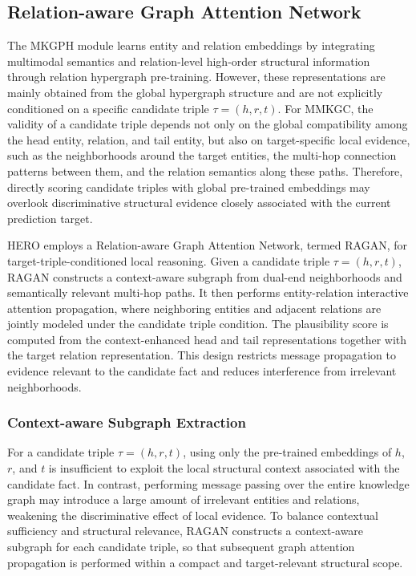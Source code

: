 \documentclass[pdflatex,sn-mathphys-num]{sn-jnl}
\begin{document}
\subsection{Relation-aware Graph Attention Network}

The MKGPH module learns entity and relation embeddings by integrating multimodal semantics and relation-level high-order structural information through relation hypergraph pre-training. However, these representations are mainly obtained from the global hypergraph structure and are not explicitly conditioned on a specific candidate triple $\tau=(h,r,t)$. For MMKGC, the validity of a candidate triple depends not only on the global compatibility among the head entity, relation, and tail entity, but also on target-specific local evidence, such as the neighborhoods around the target entities, the multi-hop connection patterns between them, and the relation semantics along these paths. Therefore, directly scoring candidate triples with global pre-trained embeddings may overlook discriminative structural evidence closely associated with the current prediction target.

HERO employs a Relation-aware Graph Attention Network, termed RAGAN, for target-triple-conditioned local reasoning. Given a candidate triple $\tau=(h,r,t)$, RAGAN constructs a context-aware subgraph from dual-end neighborhoods and semantically relevant multi-hop paths. It then performs entity-relation interactive attention propagation, where neighboring entities and adjacent relations are jointly modeled under the candidate triple condition. The plausibility score is computed from the context-enhanced head and tail representations together with the target relation representation. This design restricts message propagation to evidence relevant to the candidate fact and reduces interference from irrelevant neighborhoods.

\subsubsection{Context-aware Subgraph Extraction}

For a candidate triple $\tau=(h,r,t)$, using only the pre-trained embeddings of $h$, $r$, and $t$ is insufficient to exploit the local structural context associated with the candidate fact. In contrast, performing message passing over the entire knowledge graph may introduce a large amount of irrelevant entities and relations, weakening the discriminative effect of local evidence. To balance contextual sufficiency and structural relevance, RAGAN constructs a context-aware subgraph for each candidate triple, so that subsequent graph attention propagation is performed within a compact and target-relevant structural scope.
\end{document}
